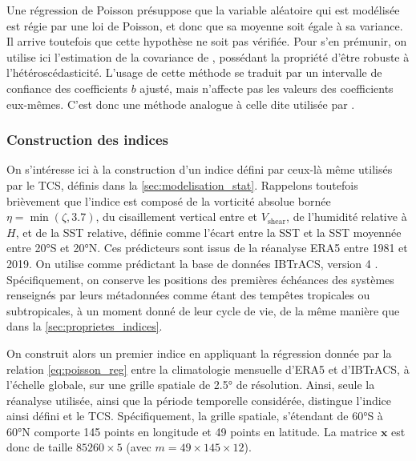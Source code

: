 \documentclass[../main.tex]{subfiles}
\begin{document}
Une régression de Poisson présuppose que la variable aléatoire qui est modélisée est régie par une loi de Poisson, et donc que sa moyenne soit égale à sa
variance. Il arrive toutefois que cette hypothèse ne soit pas vérifiée. Pour s'en prémunir, on utilise ici l'estimation de la covariance de
\textcite{mackinnon_heteroskedasticityconsistent_1985}, possédant la propriété d'être robuste à l'hétéroscédasticité. L'usage de cette méthode se traduit par un
intervalle de confiance des coefficients $b$ ajusté, mais n'affecte pas les valeurs des coefficients eux-mêmes. C'est donc une méthode analogue à celle dite
 utilisée par \textcite{tippett_poisson_2011}.

\subsubsection*{Construction des indices}

On s'intéresse ici à la construction d'un indice défini par ceux-là même utilisés par le TCS, définis dans la \cref{sec:modelisation_stat}. Rappelons toutefois
brièvement que l'indice est composé de la vorticité absolue bornée $\eta = \min(\zeta, \num{3.7})$, du cisaillement vertical entre  et 
$V_{\mathrm{shear}}$, de l'humidité relative à  $H$, et de la SST relative, définie comme l'écart entre la SST et la SST moyennée entre \ang{20}S et
\ang{20}N. Ces prédicteurs sont issus de la réanalyse ERA5 entre \num{1981} et \num{2019}. On utilise comme prédictant la base de données IBTrACS, version 4
\parencite{knapp_international_2010}. Spécifiquement, on conserve les positions des premières échéances des systèmes renseignés par leurs métadonnées comme
étant des tempêtes tropicales ou subtropicales, à un moment donné de leur cycle de vie, de la même manière que dans la \cref{sec:proprietes_indices}.

On construit alors un premier indice en appliquant la régression donnée par la relation \ref{eq:poisson_reg} entre la climatologie mensuelle d'ERA5 et
d'IBTrACS, à l'échelle globale, sur une grille spatiale de \ang{2.5} de résolution. Ainsi, seule la réanalyse utilisée, ainsi que la période temporelle
considérée, distingue l'indice ainsi défini et le TCS. Spécifiquement, la grille spatiale, s'étendant de \ang{60}S à \ang{60}N comporte \num{145} points en
longitude et \num{49} points en latitude. La matrice $\mathbf{x}$ est donc de taille $\num{85260} \times \num{5}$ (avec $m = \num{49} \times \num{145} \times
\num{12}$).
\end{document}
